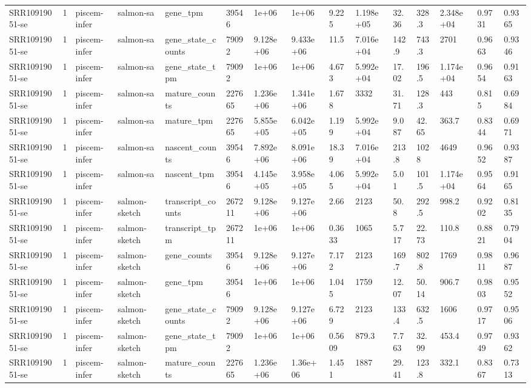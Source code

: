 \begin{tabular}{lllllllllllllll}
SRR10919051-se & 1 & piscem-infer & salmon-sa & gene\_tpm & 39546 & 1e+06 & 1e+06 & 9.225 & 1.198e+05 & 32.36 & 328.3 & 2.348e+04 & 0.9731 & 0.9365 \\
SRR10919051-se & 1 & piscem-infer & salmon-sa & gene\_state\_counts & 79092 & 9.128e+06 & 9.433e+06 & 11.5 & 7.016e+04 & 142.9 & 743.3 & 2701 & 0.9663 & 0.9346 \\
SRR10919051-se & 1 & piscem-infer & salmon-sa & gene\_state\_tpm & 79092 & 1e+06 & 1e+06 & 4.673 & 5.992e+04 & 17.02 & 196.5 & 1.174e+04 & 0.9654 & 0.9163 \\
SRR10919051-se & 1 & piscem-infer & salmon-sa & mature\_counts & 227665 & 1.236e+06 & 1.341e+06 & 1.678 & 3332 & 31.71 & 128.3 & 443 & 0.815 & 0.6984 \\
SRR10919051-se & 1 & piscem-infer & salmon-sa & mature\_tpm & 227665 & 5.855e+05 & 6.042e+05 & 1.199 & 5.992e+04 & 9.087 & 42.65 & 363.7 & 0.8344 & 0.6971 \\
SRR10919051-se & 1 & piscem-infer & salmon-sa & nascent\_counts & 39546 & 7.892e+06 & 8.091e+06 & 18.39 & 7.016e+04 & 213.8 & 1028 & 4649 & 0.9652 & 0.9387 \\
SRR10919051-se & 1 & piscem-infer & salmon-sa & nascent\_tpm & 39546 & 4.145e+05 & 3.958e+05 & 4.065 & 5.992e+04 & 5.01 & 101.5 & 1.174e+04 & 0.9564 & 0.9165 \\
SRR10919051-se & 1 & piscem-infer & salmon-sketch & transcript\_counts & 267211 & 9.128e+06 & 9.127e+06 & 2.66 & 2123 & 50.8 & 292.5 & 998.2 & 0.9202 & 0.8135 \\
SRR10919051-se & 1 & piscem-infer & salmon-sketch & transcript\_tpm & 267211 & 1e+06 & 1e+06 & 0.3633 & 1065 & 5.717 & 22.73 & 110.8 & 0.8821 & 0.7904 \\
SRR10919051-se & 1 & piscem-infer & salmon-sketch & gene\_counts & 39546 & 9.128e+06 & 9.127e+06 & 7.172 & 2123 & 169.7 & 802.8 & 1769 & 0.9811 & 0.9687 \\
SRR10919051-se & 1 & piscem-infer & salmon-sketch & gene\_tpm & 39546 & 1e+06 & 1e+06 & 1.045 & 1759 & 12.07 & 50.14 & 906.7 & 0.9803 & 0.9552 \\
SRR10919051-se & 1 & piscem-infer & salmon-sketch & gene\_state\_counts & 79092 & 9.128e+06 & 9.127e+06 & 6.729 & 2123 & 133.4 & 632.5 & 1606 & 0.9717 & 0.9506 \\
SRR10919051-se & 1 & piscem-infer & salmon-sketch & gene\_state\_tpm & 79092 & 1e+06 & 1e+06 & 0.5609 & 879.3 & 7.763 & 32.99 & 453.4 & 0.9749 & 0.9362 \\
SRR10919051-se & 1 & piscem-infer & salmon-sketch & mature\_counts & 227665 & 1.236e+06 & 1.36e+06 & 1.451 & 1887 & 29.41 & 123.8 & 332.1 & 0.8367 & 0.7313 \\

\end{tabular}
